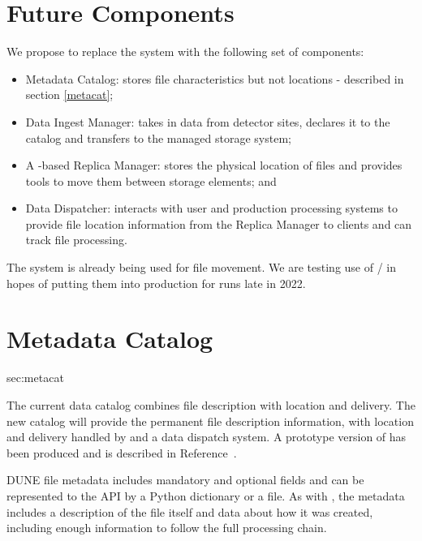 \documentclass[../main-v1.tex]{subfiles}
\begin{document}
\section{Future Components}
We propose to replace the  system with %
the following set of components: 

\begin{itemize}
\item Metadata Catalog: stores file characteristics but not locations - described in section \ref{metacat};    
    \item Data Ingest Manager: takes in data from detector sites, declares it to the catalog and transfers to the managed storage system;
    \item A -based Replica Manager: stores the physical location of files and provides tools to move them between storage elements; and
    \item Data Dispatcher: interacts with user and production processing systems%
    to provide file location information from the Replica Manager to clients and can track file processing. 
\end{itemize}

The  system is already being used for file movement.  We are testing use of / in hopes of putting them into production for  runs late in 2022. 


\section{Metadata Catalog }{sec:metacat}

The current  data catalog combines file description with location and delivery.  The new  catalog will provide the permanent file description information, with location and delivery handled by  and a data dispatch system. 
A prototype version of  has been produced and is described in Reference~\cite{Mandrichenko:2021spd}. 

DUNE file metadata includes mandatory and optional fields and can be represented to the API by a Python dictionary or a  file. 
As with , the metadata includes a description of the file itself and data about how it was created, including enough information to follow the full processing chain.   
\end{document}
